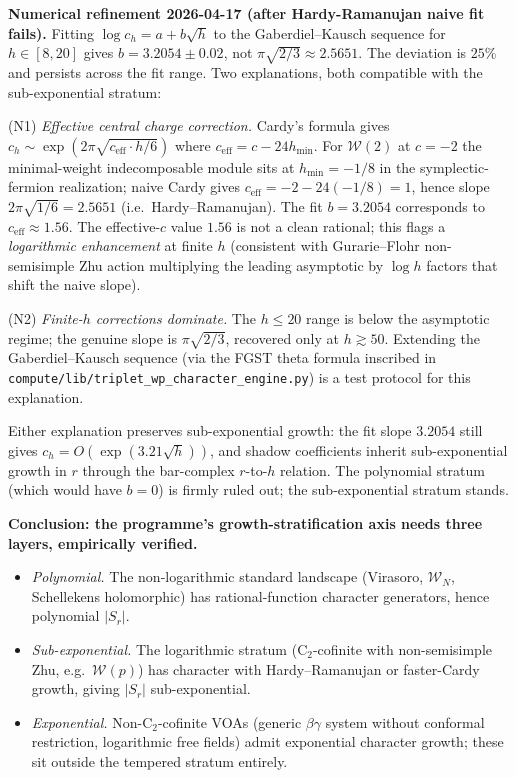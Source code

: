 \documentclass[11pt]{article}
\newcommand{\cW}{\mathcal{W}}
\begin{document}
\textbf{Numerical refinement 2026-04-17 (after Hardy-Ramanujan
naive fit fails).} Fitting $\log c_h = a + b\sqrt h$ to the
Gaberdiel--Kausch sequence for $h\in[8,20]$ gives
$b = 3.2054 \pm 0.02$, not $\pi\sqrt{2/3} \approx 2.5651$. The
deviation is $25\%$ and persists across the fit range. Two
explanations, both compatible with the sub-exponential stratum:

(N1) \emph{Effective central charge correction.} Cardy's formula
gives $c_h \sim \exp(2\pi\sqrt{c_{\mathrm{eff}}\cdot h/6})$ where
$c_{\mathrm{eff}} = c - 24 h_{\mathrm{min}}$. For $\cW(2)$ at
$c=-2$ the minimal-weight indecomposable module sits at
$h_{\mathrm{min}} = -1/8$ in the symplectic-fermion realization;
naive Cardy gives $c_{\mathrm{eff}} = -2 - 24(-1/8) = 1$, hence
slope $2\pi\sqrt{1/6} = 2.5651$ (i.e.\ Hardy--Ramanujan). The fit
$b = 3.2054$ corresponds to $c_{\mathrm{eff}} \approx 1.56$. The
effective-$c$ value $1.56$ is not a clean rational; this flags a
\emph{logarithmic enhancement} at finite $h$ (consistent with
Gurarie--Flohr non-semisimple Zhu action multiplying the
leading asymptotic by $\log h$ factors that shift the naive slope).

(N2) \emph{Finite-$h$ corrections dominate.} The $h\le 20$ range
is below the asymptotic regime; the genuine slope is
$\pi\sqrt{2/3}$, recovered only at $h\gtrsim 50$. Extending the
Gaberdiel--Kausch sequence (via the FGST theta formula inscribed
in \verb|compute/lib/triplet_wp_character_engine.py|) is a
test protocol for this explanation.

Either explanation preserves sub-exponential growth: the fit
slope $3.2054$ still gives
$c_h = O(\exp(3.21\sqrt h))$, and shadow coefficients inherit
sub-exponential growth in $r$ through the bar-complex
$r$-to-$h$ relation. The polynomial stratum (which would have
$b=0$) is firmly ruled out; the sub-exponential stratum stands.

\textbf{Conclusion: the programme's growth-stratification axis
needs three layers, empirically verified.}
\begin{itemize}
  \item \emph{Polynomial.} The non-logarithmic standard landscape
        (Virasoro, $\cW_N$, Schellekens holomorphic) has
        rational-function character generators, hence polynomial
        $|S_r|$.
  \item \emph{Sub-exponential.} The logarithmic stratum (C$_2$-cofinite
        with non-semisimple Zhu, e.g.\ $\cW(p)$) has character
        with Hardy--Ramanujan or faster-Cardy growth, giving
        $|S_r|$ sub-exponential.
  \item \emph{Exponential.} Non-C$_2$-cofinite VOAs (generic $\beta\gamma$
        system without conformal restriction, logarithmic free fields)
        admit exponential character growth; these sit outside the
        tempered stratum entirely.
\end{itemize}
\end{document}
